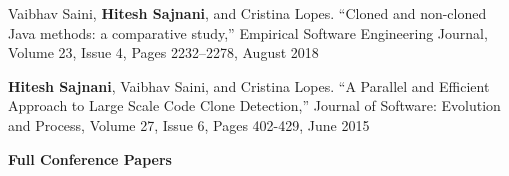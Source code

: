 \documentclass[letterpaper,11pt]{article}
\begin{document}
\begin{etaremune}
 \item\small{Vaibhav Saini, \textbf{Hitesh Sajnani}, and Cristina Lopes. “Cloned and non-cloned Java methods: a comparative study,” Empirical Software Engineering Journal, Volume 23, Issue 4, Pages 2232–2278, August 2018}

 \item\small{\textbf{Hitesh Sajnani}, Vaibhav Saini, and Cristina Lopes. “A Parallel and Efficient Approach to Large Scale Code Clone Detection,” Journal of Software: Evolution and Process, Volume 27, Issue 6,
Pages 402-429, June 2015 }

\end{etaremune}

\textbf{ Full Conference Papers}
\end{document}
